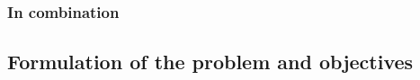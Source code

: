 \subsubsection{In combination}\label{sec:broadliterature:combination}


\subsection{Formulation of the problem and objectives}





